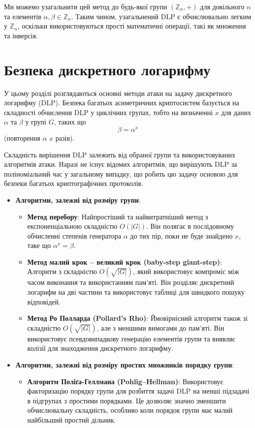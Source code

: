 \documentclass[12pt]{report}
\theoremstyle{definition}
\theoremstyle{plain}
\begin{document}
Ми можемо узагальнити цей метод до будь-якої групи \( (\mathbb{Z}_n, +) \) для довільного \( n \) та елементів \( \alpha, \beta \in \mathbb{Z}_n \). Таким чином, узагальнений DLP є обчислювально легким у \( \mathbb{Z}_n \), оскільки використовуються прості математичні операції, такі як множення та інверсія.

\section{Безпека дискретного логарифму}

У цьому розділі розглядаються основні методи атаки на задачу дискретного логарифму (DLP). Безпека багатьох асиметричних криптосистем базується на складності обчислення DLP у циклічних групах, тобто на визначенні \( x \) для даних \( \alpha \) та \( \beta \) у групі \( G \), таких що
\[
\beta = \alpha^x
\]
(повторення \( \alpha \) \( x \) разів).

Складність вирішення DLP залежить від обраної групи та використовуваних алгоритмів атаки. Наразі не існує відомих алгоритмів, що вирішують DLP за поліноміальний час у загальному випадку, що робить цю задачу основою для безпеки багатьох криптографічних протоколів.

\begin{itemize}
    \item \textbf{Алгоритми, залежні від розміру групи}:
    \begin{itemize}
        \item \textbf{Метод перебору}: Найпростіший та найвитратніший метод з експоненціальною складністю \( O(|G|) \). Він полягає в послідовному обчисленні степенів генератора \( \alpha \) до тих пір, поки не буде знайдено \( x \), таке що \( \alpha^x = \beta \).
        
        \item \textbf{Метод малий крок – великий крок (baby-step giant-step)}: Алгоритм з складністю \( O(\sqrt{|G|}) \), який використовує компроміс між часом виконання та використанням пам'яті. Він розділяє дискретний логарифм на дві частини та використовує таблиці для швидкого пошуку відповідей.
        
        \item \textbf{Метод Ро Полларда (Pollard’s Rho)}: Ймовірнісний алгоритм також зі складністю \( O(\sqrt{|G|}) \), але з меншими вимогами до пам'яті. Він використовує псевдовипадкову генерацію елементів групи та виявляє колізії для знаходження дискретного логарифму.
    \end{itemize}
    
    \item \textbf{Алгоритми, залежні від розміру простих множників порядку групи}:
    \begin{itemize}
        \item \textbf{Алгоритм Поліґа-Геллмана (Pohlig–Hellman)}: Використовує факторизацію порядку групи для розбиття задачі DLP на менші підзадачі в підгрупах з простими порядками. Це дозволяє значно зменшити обчислювальну складність, особливо коли порядок групи має малий найбільший простий дільник.
    \end{itemize}
\end{itemize}
\end{document}
